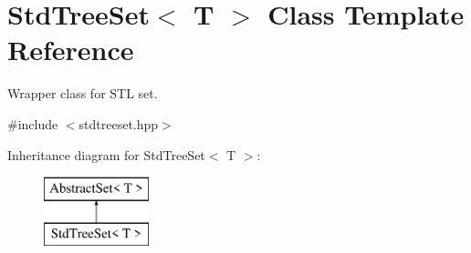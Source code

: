 \hypertarget{class_std_tree_set}{\section{Std\-Tree\-Set$<$ T $>$ Class Template Reference}
\label{class_std_tree_set}
}


Wrapper class for S\-T\-L set.  




{\ttfamily \#include $<$stdtreeset.\-hpp$>$}

Inheritance diagram for Std\-Tree\-Set$<$ T $>$\-:\begin{figure}[H]
\begin{center}
\leavevmode
\includegraphics[height=2.000000cm]{class_std_tree_set}
\end{center}
\end{figure}
